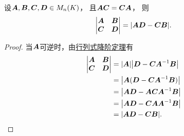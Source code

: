 \begin{example}
设\(\vb{A},\vb{B},\vb{C},\vb{D} \in M_n(K)\)，
且\(\vb{A} \vb{C} = \vb{C} \vb{A}\)，
则\begin{equation*}
	\begin{vmatrix}
		\vb{A} & \vb{B} \\
		\vb{C} & \vb{D}
	\end{vmatrix}
	= \abs{\vb{A} \vb{D} - \vb{C} \vb{B}}.
\end{equation*}
\begin{proof}
当\(\vb{A}\)可逆时，由\hyperref[equation:逆矩阵.行列式降阶公式1]{行列式降阶定理}有\begin{align*}
	\begin{vmatrix}
		\vb{A} & \vb{B} \\
		\vb{C} & \vb{D}
	\end{vmatrix}
	&= \abs{\vb{A}} \abs{\vb{D} - \vb{C} \vb{A}^{-1} \vb{B}} \\
	&= \abs{\vb{A} (\vb{D} - \vb{C} \vb{A}^{-1} \vb{B})} \\
	&= \abs{\vb{A} \vb{D} - \vb{A} \vb{C} \vb{A}^{-1} \vb{B}} \\
	&= \abs{\vb{A} \vb{D} - \vb{C} \vb{A} \vb{A}^{-1} \vb{B}} \\
	&= \abs{\vb{A} \vb{D} - \vb{C} \vb{B}}.
	\qedhere
\end{align*}
\end{proof}
\end{example}

